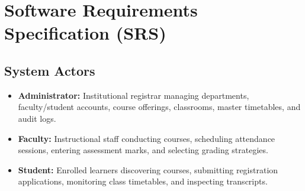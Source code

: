 \documentclass[12pt,a4paper,oneside]{report}
\begin{document}
\chapter{Software Requirements Specification (SRS)}

\section{System Actors}
\begin{itemize}
    \item \textbf{Administrator:} Institutional registrar managing departments, faculty/student accounts, course offerings, classrooms, master timetables, and audit logs.
    \item \textbf{Faculty:} Instructional staff conducting courses, scheduling attendance sessions, entering assessment marks, and selecting grading strategies.
    \item \textbf{Student:} Enrolled learners discovering courses, submitting registration applications, monitoring class timetables, and inspecting transcripts.
\end{itemize}
\end{document}
